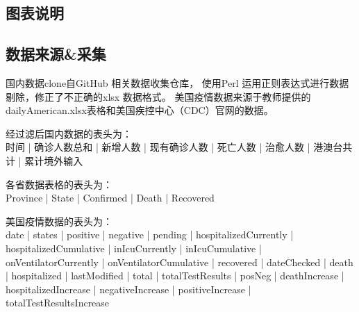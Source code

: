 \documentclass[UTF8]{ctexart}
\begin{document}
\subsection{图表说明}

\begin{table}[]
    \centering
    \caption{\bf 图表说明}
    \end{table}

\subsection{数据来源\&采集}
国内数据clone自GitHub 相关数据收集仓库\cite{bib1}，
使用Perl 运用正则表达式进行数据剔除，修正了不正确的xlsx 数据格式。
美国疫情数据来源于教师提供的dailyAmerican.xlsx表格和美国疾控中心（CDC）官网\cite{usaCdc}的数据。
\\
\par 经过滤后国内数据的表头为：
\\
 时间 | 确诊人数总和 | 新增人数 | 现有确诊人数 |
死亡人数 | 治愈人数	 | 港澳台共计 | 累计境外输入
\\
\par 各省数据表格的表头为：
\\
Province | State | Confirmed | Death | Recovered
\\
\par 美国疫情数据的表头为：
\\
date | states | positive | negative | pending | hospitalizedCurrently | hospitalizedCumulative | inIcuCurrently | inIcuCumulative | onVentilatorCurrently | onVentilatorCumulative | recovered | dateChecked | death | hospitalized | lastModified | total | totalTestResults | posNeg | deathIncrease | hospitalizedIncrease | negativeIncrease | positiveIncrease | totalTestResultsIncrease 
\\\hspace*{\fill}\\
\end{document}
